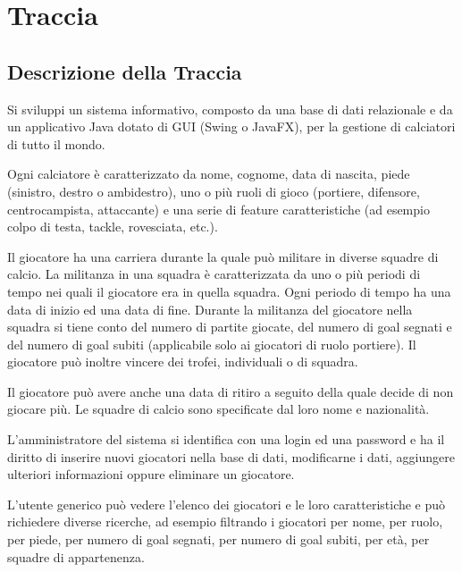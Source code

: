 \section{Traccia}

\subsection{\Large Descrizione della Traccia}
\bigskip

Si sviluppi un sistema informativo, composto da una base
di dati relazionale e da un applicativo Java dotato
di GUI (Swing o JavaFX), per la gestione
di calciatori di tutto il mondo.

Ogni calciatore è caratterizzato da nome, cognome,
data di nascita, piede (sinistro, destro o ambidestro),
uno o più ruoli di gioco (portiere, difensore,
centrocampista, attaccante) e una serie
di feature caratteristiche (ad esempio colpo di testa,
tackle, rovesciata, etc.).

Il giocatore ha una carriera durante
la quale può militare in diverse squadre di calcio.
La militanza in una squadra è caratterizzata
da uno o più periodi di tempo nei quali
il giocatore era in quella squadra.
Ogni periodo di tempo ha una data di inizio
ed una data di fine.
Durante la militanza del giocatore nella squadra
si tiene conto del numero di partite giocate,
del numero di goal segnati e del numero
di goal subiti (applicabile solo ai giocatori
di ruolo portiere). Il giocatore può inoltre vincere
dei trofei, individuali o di squadra.

Il giocatore può avere anche una data di ritiro
a seguito della quale decide di non giocare più.
Le squadre di calcio sono specificate
dal loro nome e nazionalità.

L’amministratore del sistema si identifica con una login
ed una password e ha il diritto di inserire
nuovi giocatori nella base di dati, modificarne i dati,
aggiungere ulteriori informazioni
oppure eliminare un giocatore.

L’utente generico può vedere l’elenco dei giocatori e
le loro caratteristiche e può richiedere diverse ricerche,
ad esempio filtrando i giocatori per nome, per ruolo,
per piede, per numero di goal segnati,
per numero di goal subiti, per età,
per squadre di appartenenza.